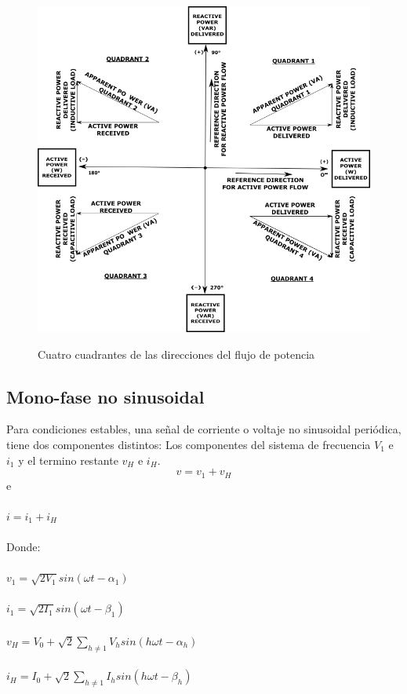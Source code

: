 \begin{figure}[H]
\centering
\includegraphics{2Marco/triangulopotencias}
\caption{ Cuatro cuadrantes de las direcciones del flujo de potencia} \cite{A30} 
\label{fig:triangulo}
\end{figure} 


\subsection{Mono-fase no sinusoidal}

Para condiciones estables, una señal de corriente o voltaje no sinusoidal periódica, tiene dos componentes distintos: Los componentes del sistema de frecuencia $V_{1}$ e $i_{1}$ y el termino restante $v_{H}$ e $i_{H}$.\cite{A30}\\

\begin{equation}\label{EQ22}
v=v_{1}+v_{H} 
\end{equation}
e\\\\
$i=i_{1}+i_{H}$\\\\
Donde:\\\\
$v_{1}=\sqrt{2V_{1}}sin(\omega t - \alpha_{1})$\\\\
$i_{1}=\sqrt{2I_{1}}sin(\omega t - \beta_{1})$\\\\
$v_{H}=V_{0}+\sqrt{2}\sum_{h\neq 1}^{}V_{h}sin(h\omega t-\alpha_{h})$\\\\
$i_{H}=I_{0}+\sqrt{2}\sum_{h\neq 1}^{}I_{h}sin(h\omega t-\beta_{h})$\\\\

